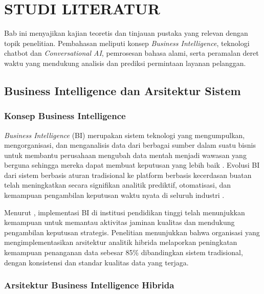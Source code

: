 \chapter{STUDI LITERATUR}

Bab ini menyajikan kajian teoretis dan tinjauan pustaka yang relevan dengan topik penelitian. Pembahasan meliputi konsep \textit{Business Intelligence}, teknologi chatbot dan \textit{Conversational AI}, pemrosesan bahasa alami, serta peramalan deret waktu yang mendukung analisis dan prediksi permintaan layanan pelanggan.

\section{Business Intelligence dan Arsitektur Sistem}

\subsection{Konsep Business Intelligence}

\textit{Business Intelligence} (BI) merupakan sistem teknologi yang mengumpulkan, mengorganisasi, dan menganalisis data dari berbagai sumber dalam suatu bisnis untuk membantu perusahaan mengubah data mentah menjadi wawasan yang berguna sehingga mereka dapat membuat keputusan yang lebih baik \parencite{sorour2020business}. Evolusi BI dari sistem berbasis aturan tradisional ke platform berbasis kecerdasan buatan telah meningkatkan secara signifikan analitik prediktif, otomatisasi, dan kemampuan pengambilan keputusan waktu nyata di seluruh industri \parencite{khaddam2025ai}.

Menurut \textcite{sorour2020business}, implementasi BI di institusi pendidikan tinggi telah menunjukkan kemampuan untuk memantau aktivitas jaminan kualitas dan mendukung pengambilan keputusan strategis. Penelitian \textcite{shah2025hybrid} menunjukkan bahwa organisasi yang mengimplementasikan arsitektur analitik hibrida melaporkan peningkatan kemampuan penanganan data sebesar 85\% dibandingkan sistem tradisional, dengan konsistensi dan standar kualitas data yang terjaga.

\subsection{Arsitektur Business Intelligence Hibrida}

